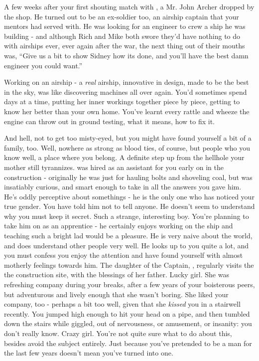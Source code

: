 \documentclass[char]{airship}
\begin{document}
   
A few weeks after your first shouting match with \cCurie{}, a Mr. John
Archer dropped by the shop. He turned out to be an ex-soldier too, an
airship captain that your mentors had served with. He was looking for
an engineer to crew a ship he was building - and although Rich and
Mike both swore they'd have nothing to do with airships ever, ever
again after the war, the next thing out of their mouths was, ``Give us
a bit to show Sidney how its done, and you'll have the best damn
engineer you could want.''

Working on an airship - a \emph{real} airship, innovative in design,
made to be the best in the sky, was like discovering machines all over
again. You'd sometimes spend days at a time, putting her inner
workings together piece by piece, getting to know her better than your
own home. You've learnt every rattle and wheeze the engine can throw
out in ground testing, what it means, how to fix it.

And hell, not to get too misty-eyed, but you might have found yourself
a bit of a family, too. Well, nowhere as strong as blood ties, of
course, but people who you know well, a place where you belong. A
definite step up from the hellhole your mother still
tyrannizes. \cRobot{} was hired as an assistant for you early on in
the construction - originally he was just for hauling bolts and
shoveling coal, but \cRobot{} was insatiably curious, and smart enough
to take in all the answers you gave him. He's oddly perceptive about
somethings - he is the only one who has noticed your true gender. You
have told him not to tell anyone. He doesn't seem to understand why
you must keep it secret. Such a strange, interesting boy. You're
planning to take him on as an apprentice - he certainly enjoys working
on the ship and teaching such a bright lad would be a pleasure. He is
very naive about the world, and does understand other people very
well. He looks up to you quite a lot, and you must confess you enjoy
the attention and have found yourself with almost motherly feelings
towards him. The daughter of the Captain, \cThief{}, regularly visits
the the construction site, with the blessings of her father. Lucky
girl. She was refreshing company during your breaks, after a few years
of your boisterous peers, but adventurous and lively enough that she
wasn't boring. She liked your company, too - perhaps a bit too well,
given that she \emph{kissed} you in a stairwell recently. You jumped
high enough to hit your head on a pipe, and then tumbled down the
stairs while \cThief{} giggled, out of nervousness, or amusement, or
insanity: you don't really know. Crazy girl. You're not quite sure
what to do about this, besides avoid the subject entirely. Just
because you've pretended to be a man for the last few years doesn't
mean you've turned into one.
\end{document}
